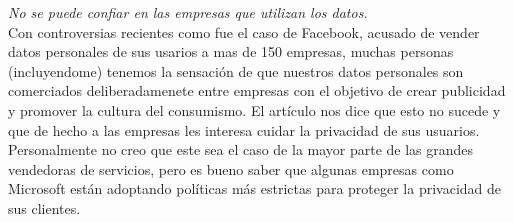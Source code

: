 \documentclass[12pt,a4paper]{article}
\begin{document}
\begin{enumerate}
\begin{enumerate}
				\textit {No se puede confiar en las empresas que utilizan los datos.}\\
        			Con controversias recientes como fue el caso de Facebook, acusado de vender 
				datos personales de sus usarios a mas de 150 empresas, muchas personas (incluyendome) 
				tenemos la sensación de que nuestros datos personales son comerciados deliberadamenete 
				entre empresas con el objetivo de crear publicidad y promover la cultura del consumismo. 
				El artículo nos dice que esto no sucede y que de hecho a las empresas les interesa cuidar 
				la privacidad de sus usuarios. Personalmente no creo que este sea el caso de la mayor 
				parte de las grandes vendedoras de servicios, pero es bueno saber que algunas empresas 
				como Microsoft están adoptando políticas más estrictas para proteger la privacidad de 
				sus clientes.
				
		\end{enumerate}

\end{enumerate}
\end{document}
